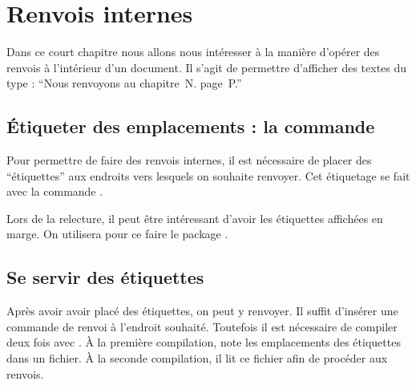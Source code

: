 \chapter{Renvois internes}\label{label}

\begin{prealable}
Dans ce court chapitre nous allons nous intéresser à la manière d'opérer des renvois à l'intérieur d'un document.
Il s'agit de permettre d'afficher des textes du type : \enquote{Nous renvoyons au chapitre~N. page~P.}
\end{prealable}

\section{Étiqueter des  emplacements : la commande }

Pour permettre de faire des renvois internes, il est nécessaire de placer des \enquote{étiquettes} aux endroits vers lesquels on souhaite renvoyer.
Cet étiquetage  se fait avec la commande .

\begin{plusloins}
Lors de la relecture, il peut être intéressant d'avoir les étiquettes affichées en marge. On utilisera pour ce faire le package .
\end{plusloins}

\section{Se servir des étiquettes}

Après avoir avoir placé des étiquettes, on peut y renvoyer. 
Il suffit d'insérer une commande de renvoi à l'endroit souhaité. 
Toutefois il est nécessaire de compiler deux fois avec \XeLaTeX.
À la première compilation,   \XeLaTeX
note les emplacements des étiquettes dans un fichier. À la seconde compilation, il lit ce fichier afin de procéder aux renvois. 

